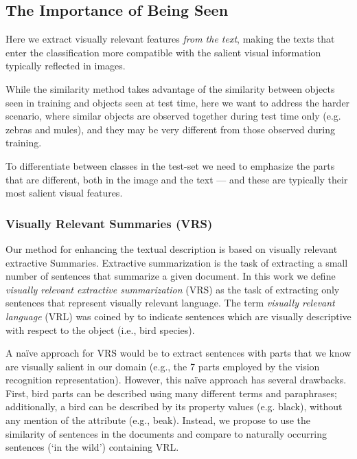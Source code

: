 \documentclass[11pt,a4paper]{article}
\newcommand\gal[1]{\textcolor{bright}{\textbf{GAL:} #1 }}
\begin{document}
\subsection{The Importance of Being Seen}

Here we extract visually relevant features \textit{from the text}, making the texts that enter the classification more compatible with the salient visual information typically reflected in images. 

While the similarity method takes advantage of the similarity between objects seen in training and objects seen at test time, here we want to address the harder scenario, where similar objects are observed together during test time only (e.g. zebras and mules), and they may be very different from those observed during training. 

To differentiate between classes in the test-set we need to emphasize the parts that are different, both in the image and the text --- and these are typically their most salient visual features. %

\subsubsection{Visually Relevant Summaries (VRS)}
\label{section:vrs_component}

Our method for enhancing the textual description is based on visually relevant extractive Summaries.
Extractive summarization is the task of extracting a small number of sentences that summarize a given document.
In this work we define {\em visually relevant extractive summarization} (VRS) as the task of extracting only sentences that represent {visually relevant} language. The term {\em visually relevant language} (VRL) was coined by \citet{winn2016detecting} to indicate sentences which are visually descriptive with respect to the object (i.e., bird species).


A {na\"{i}ve} approach for VRS would be to extract sentences with parts that we know are visually salient in our domain (e.g., the 7 parts employed by the vision recognition representation). However, this na\"{i}ve approach has several drawbacks. First, bird parts can be described using many different terms and paraphrases; additionally, a bird can be described by its property values (e.g. black), without any mention of the attribute (e.g., beak). 
Instead, we propose to use the similarity of sentences in the documents and compare to naturally occurring sentences (`in the wild') containing VRL. %
\end{document}
